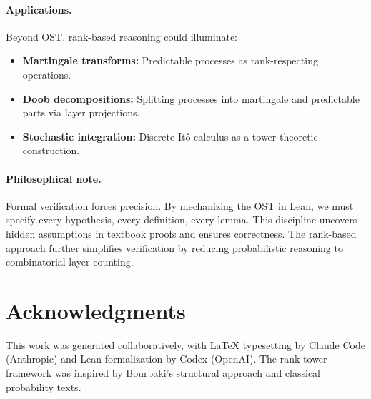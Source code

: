 \documentclass[11pt]{article}
\theoremstyle{definition}
\theoremstyle{remark}
\begin{document}
\paragraph{Applications.}
Beyond OST, rank-based reasoning could illuminate:
\begin{itemize}
\item \textbf{Martingale transforms:} Predictable processes as rank-respecting operations.
\item \textbf{Doob decompositions:} Splitting processes into martingale and predictable parts via layer projections.
\item \textbf{Stochastic integration:} Discrete Itô calculus as a tower-theoretic construction.
\end{itemize}

\paragraph{Philosophical note.}
Formal verification forces precision.
By mechanizing the OST in Lean, we must specify every hypothesis, every definition, every lemma.
This discipline uncovers hidden assumptions in textbook proofs and ensures correctness.
The rank-based approach further simplifies verification by reducing probabilistic reasoning to combinatorial layer counting.

\section*{Acknowledgments}

This work was generated collaboratively, with \LaTeX{} typesetting by Claude Code (Anthropic) and Lean formalization by Codex (OpenAI).
The rank-tower framework was inspired by Bourbaki's structural approach and classical probability texts.
\end{document}
